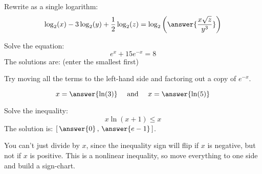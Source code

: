 \documentclass{ximera}
\author{Bobby Ramsey}
\begin{document}
\begin{exercise}
	Rewrite as a single logarithm:
	\[ \log_2 (x) - 3 \log_2(y) + \frac{1}{2} \log_2(z) = \log_2 \left( \answer{\frac{x \sqrt{z}}{y^3}}\right) \]
\end{exercise}

\begin{exercise}
	Solve the equation:
	\[ e^x + 15 e^{-x} = 8 \]
	The solutions are: (enter the smallest first)
	\begin{hint}
		Try moving all the terms to the left-hand side and factoring out a copy of $e^{-x}$.
	\end{hint}
	\[ x = \answer{\ln(3)} \quad \text{ and } \quad x = \answer{\ln(5)} \]
\end{exercise}

\begin{exercise}
	Solve the inequality:
	\[ x \ln(x+1) \leq x \]
	The solution is: $\left[ \, \answer{0} \, , \, \answer{e-1} \, \right]$.
	\begin{hint}
		You can't just divide by $x$, since the inequality sign will flip if $x$ is negative, but not if $x$ is positive.  This is a nonlinear inequality, so move everything
		to one side and build a sign-chart.
	\end{hint}
\end{exercise}
\end{document}
